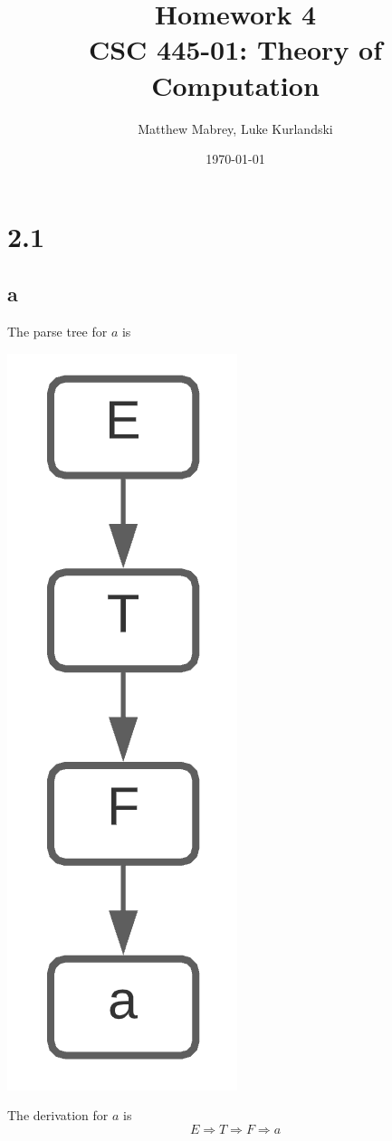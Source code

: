 \documentclass{article}
\title{Homework 4\\[0.2em]\smaller{}CSC 445-01: Theory of Computation}
\author{Matthew Mabrey, Luke Kurlandski}
\date{\today}
\begin{document}
\maketitle

\section*{2.1}


\subsection*{a}
The parse tree for $a$ is
\begin{center}
    \includegraphics[scale=.65]{2.1.a.png}
\end{center}
The derivation for $a$ is
$$E \Rightarrow T \Rightarrow F \Rightarrow a$$
\end{document}
